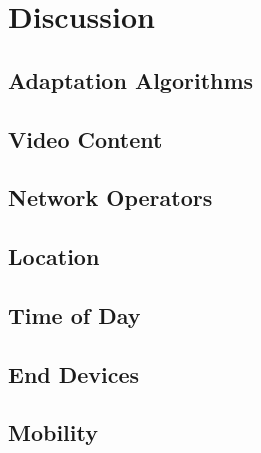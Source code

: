 
\section{Discussion}\label{sec:discussion}

\subsection{Adaptation Algorithms}

\subsection{Video Content}

\subsection{Network Operators}

\subsection{Location}

\subsection{Time of Day}

\subsection{End Devices}

\subsection{Mobility}